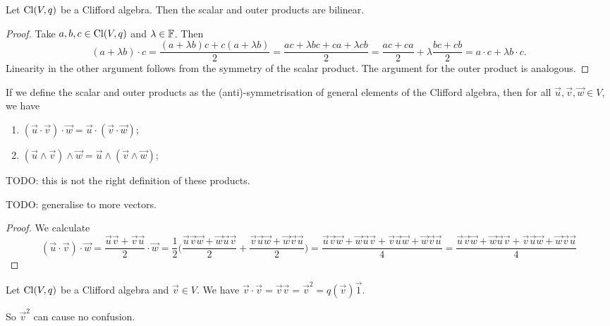 \begin{lemma}
Let $\operatorname{Cl}(V,q)$ be a Clifford algebra. Then the scalar and outer products are bilinear.
\end{lemma}
\begin{proof}
Take $a,b,c\in \operatorname{Cl}(V,q)$ and $\lambda \in \mathbb{F}$. Then
\[ (a + \lambda b)\cdot c = \frac{(a+\lambda b)c + c(a+\lambda b)}{2} = \frac{ac+\lambda bc + ca+\lambda cb}{2} = \frac{ac + ca}{2} + \lambda \frac{bc+ cb}{2} = a\cdot c + \lambda b\cdot c. \]
Linearity in the other argument follows from the symmetry of the scalar product. The argument for the outer product is analogous.
\end{proof}

\begin{lemma}
If we define the scalar and outer products as the (anti)-symmetrisation of general elements of the Clifford algebra, then for all $\vec{u}, \vec{v}, \vec{w}\in V$, we have
\begin{enumerate}
\item $(\vec{u}\cdot \vec{v})\cdot\vec{w} = \vec{u} \cdot (\vec{v}\cdot\vec{w})$;
\item $(\vec{u}\wedge \vec{v})\wedge\vec{w} = \vec{u} \wedge (\vec{v}\wedge\vec{w})$;
\end{enumerate}
\end{lemma}
TODO: this is not the right definition of these products.

TODO: generalise to more vectors.
\begin{proof}
We calculate
\[ (\vec{u}\cdot \vec{v})\cdot \vec{w} = \frac{\vec{u}\vec{v} +\vec{v}\vec{u}}{2}\cdot \vec{w} = \frac{1}{2}\big(\frac{\vec{u}\vec{v}\vec{w} + \vec{w}\vec{u}\vec{v}}{2} + \frac{\vec{v}\vec{u}\vec{w} + \vec{w}\vec{v}\vec{u}}{2}\big) = \frac{\vec{u}\vec{v}\vec{w} + \vec{w}\vec{u}\vec{v} + \vec{v}\vec{u}\vec{w} + \vec{w}\vec{v}\vec{u}}{4} = \frac{\vec{u}\vec{v}\vec{w} + \vec{w}\vec{u}\vec{v} + \vec{v}\vec{u}\vec{w} + \vec{w}\vec{v}\vec{u}}{4} \]
\end{proof}

\begin{lemma}
Let $\operatorname{Cl}(V,q)$ be a Clifford algebra and $\vec{v}\in V$. We have $\vec{v}\cdot \vec{v} = \vec{v}\vec{v} = \vec{v}^2 = q(\vec{v})\vec{1}$.
\end{lemma}
So $\vec{v}^2$ can cause no confusion.

